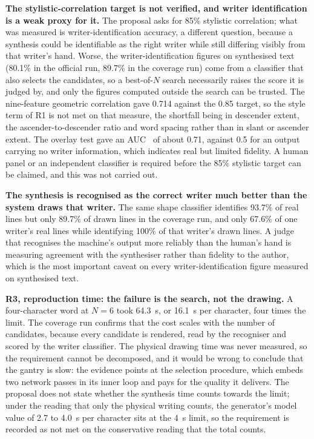         \textbf{The stylistic-correlation target is not verified, and writer identification is a weak proxy for it.}
        The proposal asks for 85\% stylistic correlation; what was measured is writer-identification accuracy, a different question, because a synthesis could be identifiable as the right writer while still differing visibly from that writer's hand.
        Worse, the writer-identification figures on synthesised text (80.1\% in the official run, 89.7\% in the coverage run) come from a classifier that also selects the candidates, so a best-of-$N$ search necessarily raises the score it is judged by, and only the figures computed outside the search can be trusted.
        The nine-feature geometric correlation gave 0.714 against the 0.85 target, so the style term of R1 is not met on that measure, the shortfall being in descender extent, the ascender-to-descender ratio and word spacing rather than in slant or ascender extent.
        The overlay test gave an AUC~\cite[p.~868]{fawcett2006} of about 0.71, against 0.5 for an output carrying no writer information, which indicates real but limited fidelity.
        A human panel or an independent classifier is required before the 85\% stylistic target can be claimed, and this was not carried out.

        \textbf{The synthesis is recognised as the correct writer much better than the system draws that writer.}
        The same shape classifier identifies 93.7\% of real lines but only 89.7\% of drawn lines in the coverage run, and only 67.6\% of one writer's real lines while identifying 100\% of that writer's drawn lines.
        A judge that recognises the machine's output more reliably than the human's hand is measuring agreement with the synthesiser rather than fidelity to the author, which is the most important caveat on every writer-identification figure measured on synthesised text.

        \textbf{R3, reproduction time: the failure is the search, not the drawing.}
        A four-character word at $N=6$ took 64.3~s, or 16.1~s per character, four times the limit.
        The coverage run confirms that the cost scales with the number of candidates, because every candidate is rendered, read by the recogniser and scored by the writer classifier.
        The physical drawing time was never measured, so the requirement cannot be decomposed, and it would be wrong to conclude that the gantry is slow: the evidence points at the selection procedure, which embeds two network passes in its inner loop and pays for the quality it delivers.
        The proposal does not state whether the synthesis time counts towards the limit; under the reading that only the physical writing counts, the generator's model value of 2.7 to 4.0~s per character sits at the 4~s limit, so the requirement is recorded as not met on the conservative reading that the total counts.

